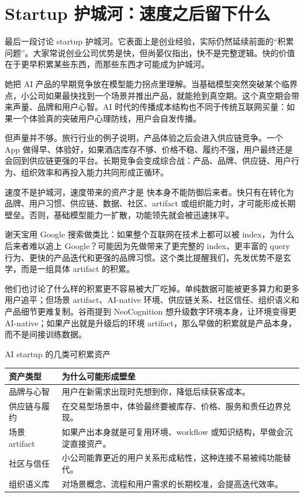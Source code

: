 \section{Startup 护城河：速度之后留下什么}

最后一段讨论 startup 护城河。它表面上是创业经验，实际仍然延续前面的“积累问题”。大家常说创业公司优势是快，但尚晏仪指出，快不是完整逻辑。快的价值在于更早积累某些东西，而那些东西才可能成为护城河。

她把 AI 产品的早期竞争放在模型能力拐点里理解。当基础模型突然突破某个临界点，小公司如果最快找到一个场景并推出产品，就能抢到真空期。这个真空期会带来声量、品牌和用户心智。AI 时代的传播成本结构也不同于传统互联网买量：如果一个体验真的突破用户心理防线，用户会自发传播。

但声量并不够。旅行行业的例子说明，产品体验之后会进入供应链竞争。一个 App 做得早、体验好，如果酒店库存不够、价格不稳、履约不强，用户最终还是会回到供应链更强的平台。长期竞争会变成综合战：产品、品牌、供应链、用户行为、组织效率和再投入能力共同形成正循环。

\begin{importantbox}{速度不是护城河，速度带来的资产才是}
快本身不能防御后来者。快只有在转化为品牌、用户习惯、供应链、数据、社区、artifact 或组织能力时，才可能形成长期壁垒。否则，基础模型能力一扩散，功能领先就会被迅速抹平。
\end{importantbox}

谢天宝用 Google 搜索做类比：如果整个互联网在技术上都可以被 index，为什么后来者难以追上 Google？可能因为先做带来了更完整的 index、更丰富的 query 行为、更快的产品迭代和更强的品牌习惯。这个类比提醒我们，先发优势不是玄学，而是一组具体 artifact 的积累。

他们也讨论了什么样的积累更不容易被大厂吃掉。单纯数据可能被更多算力和更多用户追平；但场景 artifact、AI-native 环境、供应链关系、社区信任、组织语义和产品细节更难复制。谷雨提到 NeoCognition 想升级数字环境本身，让环境变得更 AI-native；如果产出就是升级后的环境 artifact，那么早做的积累就是产品本身，而不是间接训练数据。

\begin{knowledgebox}{AI startup 的几类可积累资产}
\begin{tabularx}{\textwidth}{>{\raggedright\arraybackslash}p{} Y}
\toprule
资产类型 & 为什么可能形成壁垒 \\
\midrule
品牌与心智 & 用户在新需求出现时先想到你，降低后续获客成本。 \\
供应链与履约 & 在交易型场景中，体验最终要被库存、价格、服务和责任边界兑现。 \\
场景 artifact & 如果产出本身就是可复用环境、workflow 或知识结构，早做会沉淀直接资产。 \\
社区与信任 & 小公司能靠更近的用户关系形成粘性，这种连接不易被纯功能替代。 \\
组织语义库 & 对场景概念、流程和用户需求的长期校准，会提高迭代效率。 \\
\bottomrule
\end{tabularx}
\end{knowledgebox}

